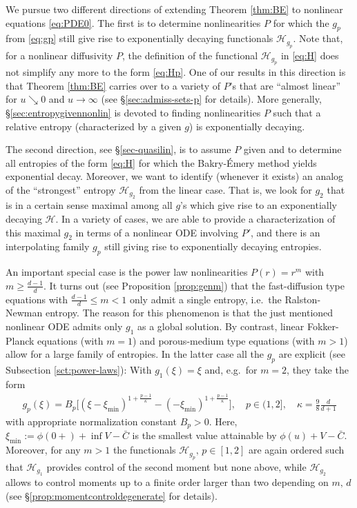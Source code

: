 \documentclass[reqno]{amsart}
\newcommand{\ximin}{\xi_{\text{min}}}
\begin{document}
We pursue two different directions of extending Theorem \ref{thm:BE} to nonlinear equations \eqref{eq:PDE0}. The first is to determine nonlinearities $P$ for which the $g_p$ from \eqref{eq:gp}
still give rise to exponentially decaying functionals $\mathcal H_{g_p}$. Note that, for a nonlinear diffusivity $P$, the definition of the functional $\mathcal H_{g_p}$ in \eqref{eq:H} does not simplify any more to the form \eqref{eq:Hp}.
One of our results in this direction is that Theorem \ref{thm:BE} carries over to a variety of $P$'s that are ``almost linear'' for $u\searrow0$ and $u\to\infty$ (see \S\ref{sec:admiss-sets-p} for details). More generally, \S\ref{sec:entropygivennonlin} is devoted to finding nonlinearities $P$ such that a relative entropy (characterized by a given $g$) is exponentially decaying. 

The second direction, see \S \ref{sec-quasilin}, is to assume $P$ given and to determine all entropies of the form \eqref{eq:H} for which the Bakry-\'Emery method yields exponential decay. Moreover, we want to identify (whenever it exists) an analog of the ``strongest'' entropy $\mathcal H_{g_2}$ from the linear case. That is, we look for $g_2$ that is in a certain sense maximal among all $g$'s which give rise to an exponentially decaying $\mathcal H$. In a variety of cases, we are able to provide a characterization of this maximal $g_2$ in terms of a nonlinear ODE involving $P'$, and there is an interpolating family $g_p$ still giving rise to exponentially decaying entropies. 

An important special case is the power law nonlinearities $P(r)=r^m$ with $m\ge\frac{d-1}{d}$. It turns out (see Proposition \ref{prop:genm}) that the fast-diffusion type equations with $\frac{d-1}{d}\le m<1$ only admit a single entropy, i.e.\ the Ralston-Newman entropy. The reason for this phenomenon is that the just mentioned nonlinear ODE  admits only $g_1$ as a global solution. By contrast, linear Fokker-Planck equations (with $m=1$) and porous-medium type equations (with $m>1$) allow for a large family of entropies. 
In the latter case all the $g_p$ are explicit (see Subsection \ref{sct:power-laws}): With $g_1(\xi)=\xi$ and, e.g.\ for $m=2$, they take the form
\begin{align*}
  g_p(\xi) = B_p\big[ (\xi-\ximin)^{1+\frac{p-1}{\kappa}}-(-\ximin)^{1+\frac{p-1}{\kappa}}\big], \quad p\in(1,2],\quad \kappa=\frac98\frac{d}{d+1}
\end{align*}
with appropriate normalization constant $B_p>0$.
Here, $\ximin:=\phi(0+)+\inf V-\bar C$ is the smallest value attainable by $\phi(u)+V-\bar C$.
Moreover, for any $m>1$ the functionals $\mathcal H_{g_p},\,p\in[1,2]$ are again ordered
such that $\mathcal H_{g_1}$ provides control of the second moment but none above,
while $\mathcal H_{g_2}$ allows to control moments up to a finite order larger than two depending on $m,\,d$ (see \S\ref{prop:momentcontroldegenerate} for details).
\end{document}
